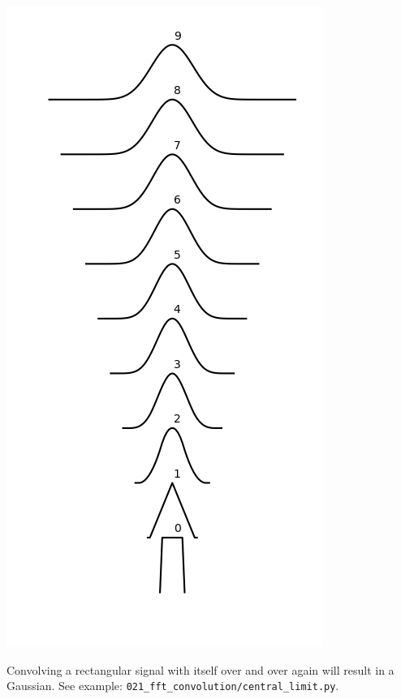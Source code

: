 \begin{marginfigure}
\begin{center}
\includegraphics[width=\textwidth]{code/021_fft_convolution/central_limit.png}
\end{center}
\caption{Convolving a rectangular signal with itself over and over
  again will result in a Gaussian. See example: \texttt{021\_fft\_convolution/central\_limit.py}.}
\label{fig:fft_convolution2}
\end{marginfigure}

